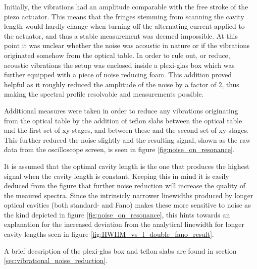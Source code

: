 Initially, the vibrations had an amplitude comparable with the free stroke of the piezo actuator. This means that the fringes stemming from scanning the cavity length would hardly change when turning off the alternating current applied to the actuator, and thus a stable measurement was deemed impossible. At this point it was unclear whether the noise was acoustic in nature or if the vibrations originated somehow from the optical table. In order to rule out, or reduce, acoustic vibrations the setup was enclosed inside a plexi-glas box which was further equipped with a piece of noise reducing foam. This addition proved helpful as it roughly reduced the amplitude of the noise by a factor of $2$, thus making the spectral profile resolvable and measurements possible. 

Additional measures were taken in order to reduce any vibrations originating from the optical table by the addition of teflon slabs between the optical table and the first set of xy-stages, and between these and the second set of xy-stages. This further reduced the noise slightly and the resulting signal, shown as the raw data from the oscilloscope screen, is seen in figure \ref{fig:noise_on_resonance}.

It is assumed that the optimal cavity length is the one that produces the highest signal when the cavity length is constant. Keeping this in mind it is easily deduced from the figure that further noise reduction will increase the quality of the meaured spectra. Since the intrinsicly narrower linewidths produced by longer optical cavities (both standard- and Fano) makes these more sensitive to noise as the kind depicted in figure \ref{fig:noise_on_resonance}, this hints towards an explanation for the increased deviation from the analytical linewidth for longer cavity lengths seen in figure \ref{fig:HWHM_vs_l_double_fano_result}.

A brief decsription of the plexi-glas box and teflon slabs are found in section \ref{sec:vibrational_noise_reduction}.

